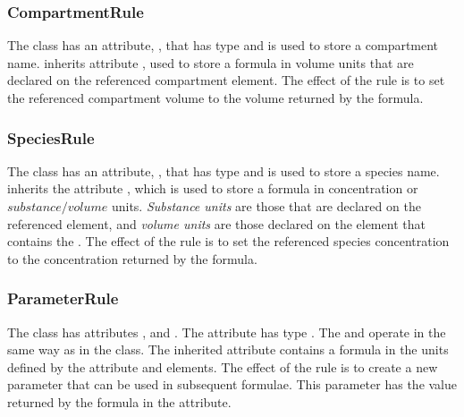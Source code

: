 \documentclass[10pt]{cek-article}
\begin{document}
\subsubsection{CompartmentRule}

The class  has an attribute, ,
that has type  and is used to store a compartment name.
 inherits attribute , used to store
a formula in volume units that are declared on the referenced compartment
element.  The effect of the rule is to set the referenced compartment
volume to the volume returned by the formula.

\subsubsection{SpeciesRule}

The class  has an attribute, ,
that has type  and is used to store a species name.
 inherits the attribute ,
which is used to store a formula in concentration or
$substance/volume$ units. \emph{Substance units} are those that
are declared on the referenced  element, and
\emph{volume units} are those declared on the 
element that contains the .  The effect of the rule
is to set the referenced species concentration to the
concentration returned by the formula.

\subsubsection{ParameterRule}

The class  has attributes ,
 and .  The  attribute has type
.  The  and  operate in the same way
as in the  class.  The inherited attribute
 contains a formula in the units defined by the
 attribute and  elements.  The effect of the rule
is to create a new parameter that can be used in subsequent formulae.  This
parameter has the value returned by the formula in the 
attribute.
\end{document}
